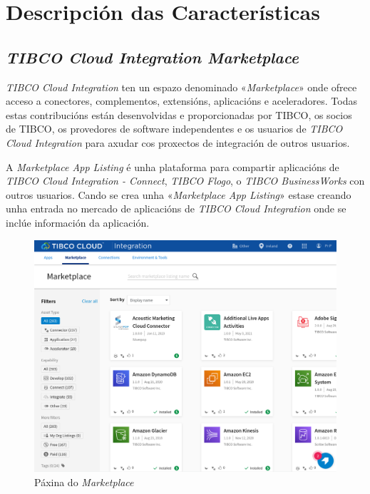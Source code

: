 \chapter{Descripción das Características}
\label{chap:DescripciónDasCaracteristicas}

\section{\textit{TIBCO Cloud Integration Marketplace}}

\textit{TIBCO Cloud Integration} ten un espazo denominado «\textit{Marketplace}» onde ofrece acceso a conectores, complementos, extensións, aplicacións e aceleradores. Todas estas contribucións están desenvolvidas e proporcionadas por TIBCO, os socios de TIBCO, os provedores de software independentes e os usuarios de \textit{TIBCO Cloud Integration} para axudar cos proxectos de integración de outros usuarios.

A \textit{Marketplace App Listing} é unha plataforma para compartir aplicacións de \textit{TIBCO Cloud Integration - Connect}, \textit{TIBCO Flogo}, o \textit{TIBCO BusinessWorks} con outros usuarios. Cando se crea unha «\textit{Marketplace App Listing}» estase creando unha entrada no mercado de aplicacións de \textit{TIBCO Cloud Integration} onde se inclúe información da aplicación.

\begin{figure}[!ht]
	\includegraphics[width=\textwidth]{img/marketplace.png}
	\caption{Páxina do \textit{Marketplace}}
	\label{fig:marketplace}
\end{figure}

